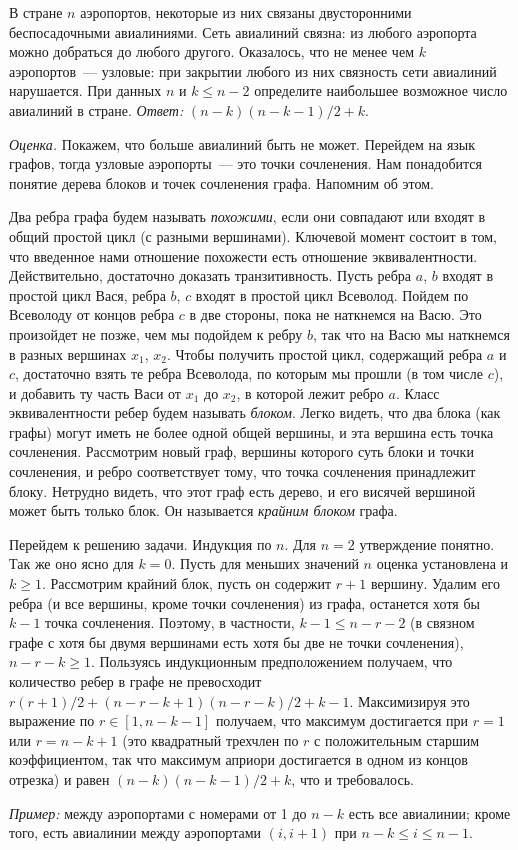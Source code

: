 \problem{}
В стране $n$ аэропортов, некоторые из них связаны двусторонними беспосадочными
авиалиниями.
Сеть авиалиний связна:
из любого аэропорта можно добраться до любого другого.
Оказалось, что не менее чем $k$ аэропортов~--- узловые:
при закрытии любого из них связность сети авиалиний нарушается.
При данных $n$ и $k \leq n - 2$ определите наибольшее возможное число авиалиний
в стране.
\solution
\emph{Ответ:} $(n - k) (n - k - 1) / 2 + k$.
\par
\emph{Оценка.}
Покажем, что больше авиалиний быть не может.
Перейдем на язык графов, тогда узловые аэропорты~--- это точки сочленения.
Нам понадобится понятие дерева блоков и точек сочленения графа.
Напомним об этом.
\par
Два ребра графа будем называть \emph{похожими}, если они совпадают или входят в
общий простой цикл (с разными вершинами).
Ключевой момент состоит в том, что введенное нами отношение похожести есть
отношение эквивалентности.
Действительно, достаточно доказать транзитивность.
Пусть ребра $a$, $b$ входят в простой цикл Вася, ребра $b$, $c$ входят в
простой цикл Всеволод.
Пойдем по Всеволоду от концов ребра $c$ в две стороны, пока не наткнемся на
Васю.
Это произойдет не позже, чем мы подойдем к ребру $b$, так что на Васю мы
наткнемся в разных вершинах $x_1$, $x_2$.
Чтобы получить простой цикл, содержащий ребра $a$ и $c$, достаточно взять те
ребра Всеволода, по которым мы прошли (в том числе $c$), и добавить ту часть
Васи от $x_1$  до $x_2$, в которой лежит ребро $a$.
Класс эквивалентности ребер будем называть \emph{блоком}.
Легко видеть, что два блока (как графы) могут иметь не более одной общей
вершины, и эта вершина есть точка сочленения.
Рассмотрим новый граф, вершины которого суть блоки и точки сочленения,
и ребро соответствует тому, что точка сочленения принадлежит блоку.
Нетрудно видеть, что этот граф есть дерево, и его висячей вершиной может быть
только блок.
Он называется \emph{крайним блоком} графа.
\par
Перейдем к решению задачи.
Индукция по $n$.
Для $n = 2$ утверждение понятно.
Так же оно ясно для $k = 0$.
Пусть для меньших значений $n$ оценка установлена и $k \geq 1$.
Рассмотрим крайний блок, пусть он содержит $r + 1$ вершину.
Удалим его ребра (и все вершины, кроме точки сочленения) из графа,
останется хотя бы $k - 1$ точка сочленения.
Поэтому, в частности, $k - 1 \leq n - r - 2$
(в связном графе с хотя бы двумя вершинами есть хотя бы две не точки
сочленения),
$n - r - k \geq 1$.
Пользуясь индукционным предположением получаем, что количество ребер в графе
не превосходит
$r (r + 1) / 2 + (n - r - k + 1) (n - r - k) / 2 + k - 1$.
Максимизируя это выражение по $r \in [1, n - k - 1]$ получаем,
что максимум достигается при $r = 1$ или $r = n - k + 1$
(это квадратный трехчлен по $r$ с положительным старшим коэффициентом,
так что максимум априори достигается в одном из концов отрезка)
и равен $(n - k) (n - k - 1) / 2 + k$, что и требовалось.
\par
\emph{Пример:}
между аэропортами с номерами от 1 до $n - k$ есть все авиалинии;
кроме того, есть авиалинии между аэропортами $(i, i + 1)$ при
$n - k \leq i \leq n - 1$.
\endproblem

